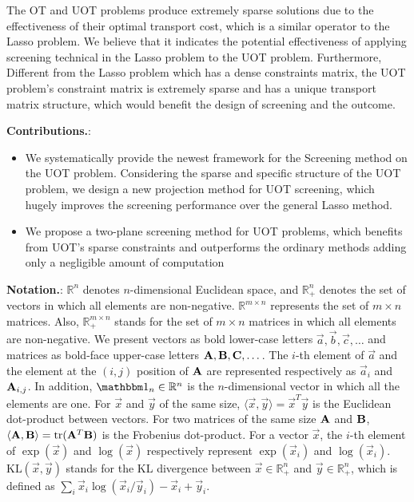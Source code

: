 The OT and UOT problems produce extremely sparse solutions due to the effectiveness of their optimal transport cost, which is a similar operator to the Lasso problem. We believe that it indicates the potential effectiveness of applying screening technical in the Lasso problem to the UOT problem. Furthermore, Different from the Lasso problem which has a dense constraints matrix, the UOT problem's constraint matrix is extremely sparse and has a unique transport matrix structure, which would benefit the design of screening and the outcome.


\textbf{Contributions.}: 
\begin{itemize}
\item We systematically provide the newest framework for the Screening method on the UOT problem. Considering the sparse and specific structure of the UOT problem, we design a new projection method for UOT screening, which hugely improves the screening performance over the general Lasso method.
\item We propose a two-plane screening method for UOT problems, which benefits from UOT's sparse constraints and outperforms the ordinary methods adding only a negligible amount of computation
\end{itemize}

\textbf{Notation.}:
$\mathbb{R}^n$ denotes $n$-dimensional Euclidean space, and $\mathbb{R}^n_+$ denotes the set of vectors in which all elements are non-negative. $\mathbb{R}^{m \times n}$ represents the set of $m \times n$ matrices. Also, $\mathbb{R}^{m \times n}_+$ stands for the set of $m \times n$ matrices in which all elements are non-negative. We present vectors as bold lower-case letters $\vec{a},\vec{b},\vec{c},\dots$ and matrices as bold-face upper-case letters $\mathbf{A},\mathbf{B},\mathbf{C},\dots$. The $i$-th element of $\vec{a}$ and the element at the $(i,j)$ position of $\mathbf{A}$ are represented respectively as $\vec{a}_i$ and $\mathbf{A}_{i,j}$. In addition, $\one_n \in \mathbb{R}^n$ is the $n$-dimensional vector in which all the elements are one. For $\vec{x}$ and $\vec{y}$ of the same size, $\langle \vec{x},\vec{y} \rangle = \vec{x}^T\vec{y}$ is the Euclidean dot-product between vectors. For two matrices of the same size $\mathbf{A}$ and $\mathbf{B}$, $\langle \mathbf{A},\mathbf{B}\rangle={\rm tr}(\mathbf{A}^T\mathbf{B})$ is the Frobenius dot-product. For a vector $\vec{x}$, the $i$-th element of $\exp (\vec{x})$ and $\log (\vec{x})$ respectively represent $\exp (\vec{x}_i)$ and $\log (\vec{x}_i)$. $\mathrm{KL}(\vec{x},\vec{y})$ stands for the KL divergence between $\vec{x} \in \mathbb{R}_+^n$ and $\vec{y} \in \mathbb{R}_+^n$, which is defined as $\sum_i \vec{x}_i \log {(\vec{x}_i/\vec{y}_i)} - \vec{x}_i + \vec{y}_i$.
 
